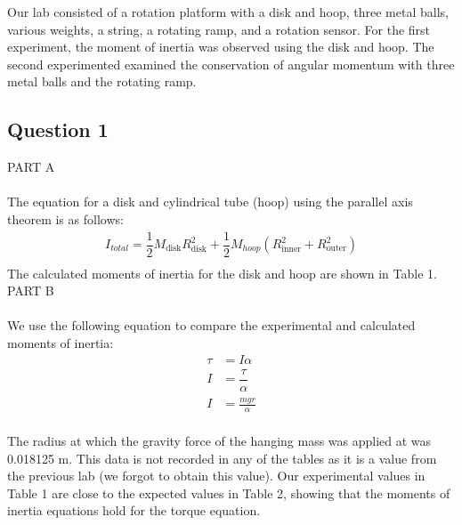 \documentclass [12pt, letterpaper, twoside] {article}
\begin{document}
\noindent
Our lab consisted of a rotation platform with a disk and hoop, three metal balls, various weights, a string, a rotating ramp, and a rotation sensor. For the first experiment, the moment of inertia was observed using the disk and hoop. The second experimented examined the conservation of angular momentum with three metal balls and the rotating ramp.

\subsection* {Question 1}

PART A \\\\
The equation for a disk and cylindrical tube (hoop) using the parallel axis theorem is as follows:
\begin {equation*}
  \begin {split}
    I_{total} = \dfrac{1}{2}M_{\text{disk}}R_{\text{disk}}^2 + \dfrac{1}{2}M_{hoop}(R_{\text{inner}}^2 + R_{\text{outer}}^2) \\
  \end {split}
\end {equation*}
The calculated moments of inertia for the disk and hoop are shown in Table 1. \\

\noindent
PART B \\\\
We use the following equation to compare the experimental and calculated moments of inertia:
\begin {equation*}
  \begin {split}
    \tau &= I\alpha \\
    I &= \dfrac{\tau}{\alpha} \\
    I &= \frac{mgr}{\alpha} \\
  \end {split}
\end {equation*}

\noindent
The radius at which the gravity force of the hanging mass was applied at was 0.018125 m. This data is not recorded in any of the tables as it is a value from the previous lab (we forgot to obtain this value). Our experimental values in Table 1 are close to the expected values in Table 2, showing that the moments of inertia equations hold for the torque equation. \\
\end{document}
